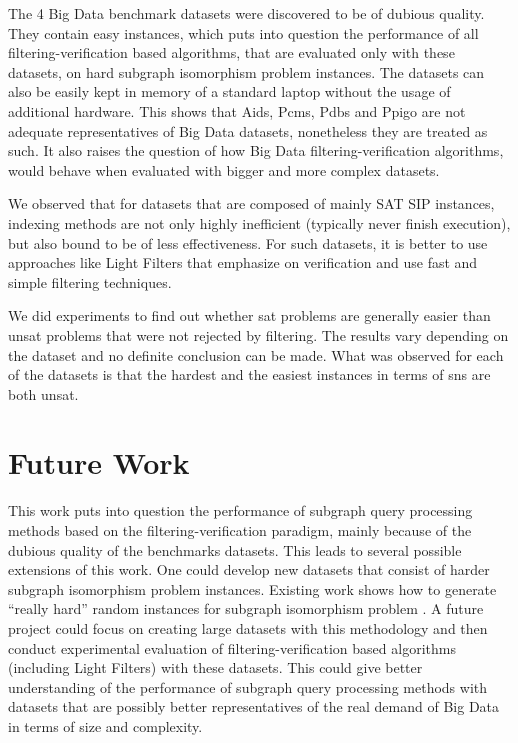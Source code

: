\documentclass{l4proj}
\begin{document}
The 4 Big Data benchmark datasets were discovered to be of dubious quality. They contain easy instances, which puts into question the performance of all filtering-verification based algorithms, that are evaluated only with these datasets, on hard subgraph isomorphism problem instances. The datasets can also be easily kept in memory of a standard laptop without the usage of additional hardware. This shows that Aids, Pcms, Pdbs and Ppigo are not adequate representatives of Big Data datasets, nonetheless they are treated as such. It also raises the question of how Big Data filtering-verification algorithms, would behave when evaluated with bigger and more complex datasets.

We observed that for datasets that are composed of mainly SAT SIP instances, indexing methods are not only highly inefficient (typically never finish execution), but also bound to be of less effectiveness. For such datasets, it is better to use approaches like Light Filters that emphasize on verification and use fast and simple filtering techniques.


We did experiments to find out whether \gls{sat} problems are generally easier than \gls{unsat} problems that were not rejected by filtering. The results vary depending on the dataset and no definite conclusion can be made. What was observed for each of the datasets is that the hardest and the easiest instances in terms of \glspl{sn} are both \gls{unsat}.  

\section{Future Work}
This work puts into question the performance of subgraph query processing methods based on the filtering-verification paradigm, mainly because of the dubious quality of the benchmarks datasets. This leads to several possible extensions of this work. %
One could develop new datasets that consist of harder subgraph isomorphism problem instances. Existing work shows how to generate ``really hard'' random instances for subgraph isomorphism problem \cite{patrick:2015}. A future project could focus on creating large datasets with this methodology and then conduct experimental evaluation of filtering-verification based algorithms (including Light Filters) with these datasets. This could give better understanding of the performance of subgraph query processing methods with datasets that are possibly better representatives of the real demand of Big Data in terms of size and complexity.
\end{document}
